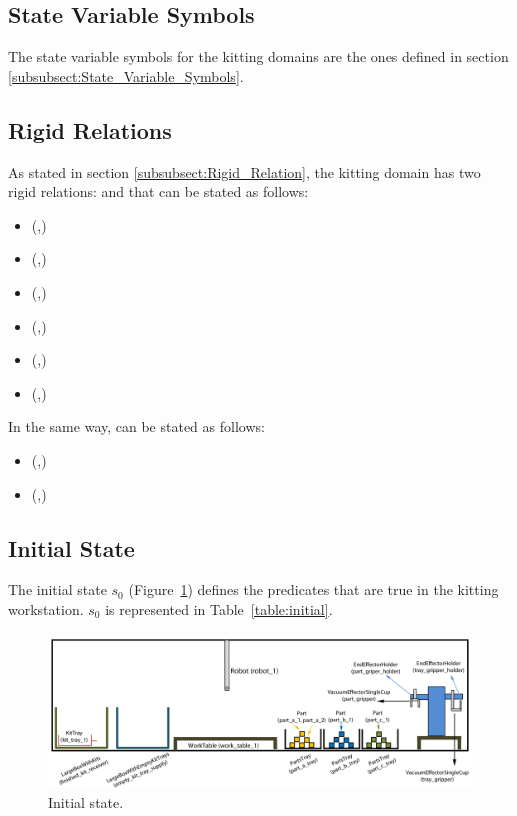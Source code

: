 \subsection{State Variable Symbols}
The state variable symbols for the kitting domains are the ones defined in section \ref{subsubsect:State_Variable_Symbols}.

\subsection{Rigid Relations}

As stated in section \ref{subsubsect:Rigid_Relation}, the kitting domain has two rigid relations:  and  that can be stated as follows:
\begin{itemize}
 \item {}(,)
 \item {}(,)
 \item {}(,)
 \item {}(,)
 \item {}(,)
 \item {}(,)
\end{itemize}


In the same way,  can be stated as follows:
\begin{itemize}
 \item {}(,)
 \item {}(,)
\end{itemize}


\subsection{Initial State}
The initial state $s_0$ (Figure~\ref{fig:s0}) defines the predicates that are true in the kitting workstation. $s_0$ is represented in Table~\ref{table:initial}.

\begin{figure}[h!b!]
\centering
\includegraphics[width=16cm]{Figure/s0.jpg}
\caption{Initial state.}
\label{fig:s0}
\end{figure}


